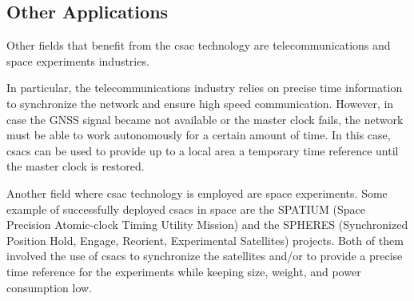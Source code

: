 \subsection{Other Applications}
\label{subsec:other_applications}

Other fields that benefit from the \acrshort{csac} technology are telecommunications and space experiments industries.

In particular, the telecommunications industry relies on precise time information to synchronize the network and ensure high speed communication.
However, in case the GNSS signal became not available or the master clock fails, the network must be able to work autonomously for a certain amount of time.
In this case, \acrshort{csacs} can be used to provide up to a local area a temporary time reference until the master clock is restored.

Another field where \acrshort{csac} technology is employed are space experiments.
Some example of successfully deployed \acrshort{csacs} in space are the SPATIUM (Space Precision Atomic-clock Timing Utility Mission) and the SPHERES (Synchronized Position Hold, Engage, Reorient, Experimental Satellites) projects.
Both of them involved the use of \acrshort{csacs} to synchronize the satellites and/or to provide a precise time reference for the experiments while keeping size, weight, and power consumption low.
